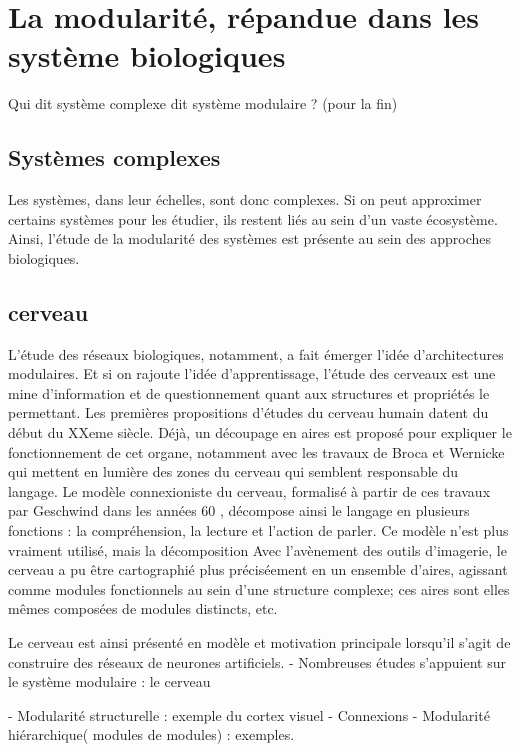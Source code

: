 \section{La modularité, répandue dans les système biologiques}

Qui dit système complexe dit système modulaire ? (pour la fin)

\subsection{Systèmes complexes}

Les systèmes, dans leur échelles, sont donc complexes. Si on peut approximer certains systèmes pour les étudier, ils restent liés au sein d'un vaste écosystème. Ainsi, l'étude de la modularité des systèmes est présente au sein des approches biologiques.

\subsection{cerveau}

L'étude des réseaux biologiques, notamment, a fait émerger l'idée d'architectures modulaires. Et si on rajoute l'idée d'apprentissage, l'étude des cerveaux est une mine d'information et de questionnement quant aux structures et propriétés le permettant. 
Les premières propositions d'études du cerveau humain datent du début du XXeme siècle. Déjà, un découpage en aires est proposé pour expliquer le fonctionnement de cet organe, notamment avec les travaux de Broca et Wernicke qui mettent en lumière des zones du cerveau qui semblent responsable du langage. Le modèle connexioniste du cerveau, formalisé à partir de ces travaux par Geschwind dans les années 60 , décompose ainsi le langage en plusieurs fonctions : la compréhension, la lecture et l'action de parler. Ce modèle n'est plus vraiment utilisé, mais la décomposition 
Avec l'avènement des outils d'imagerie, le cerveau a pu être cartographié plus préciséement en un ensemble d'aires, agissant comme modules fonctionnels au sein d'une structure complexe; ces aires sont elles mêmes composées de modules distincts, etc. 

Le cerveau est ainsi présenté en modèle et motivation principale lorsqu'il s'agit de construire des réseaux de neurones artificiels. 
- Nombreuses études s'appuient sur le système modulaire : le cerveau \cite{primate_cortex_91,mountcastle_columnar_1997,binzegger05}


- Modularité structurelle : exemple du cortex visuel
- Connexions
- Modularité hiérarchique( modules de modules) : exemples.

